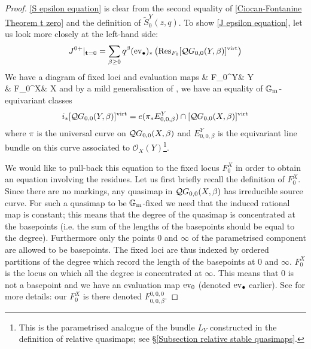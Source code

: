 \begin{proof}
\eqref{S epsilon equation} is clear from the second equality of \eqref{Ciocan-Fontanine Theorem t zero} and the definition of $\tilde{S}^Y_0(z,q)$. To show  \eqref{J epsilon equation}, let us look more closely at the left-hand side:
\begin{equation*} {J^{0+}}|_{{\mathbf{t}=0}} = \sum_{\beta\geq 0}q^\beta(\operatorname{ev}_\bullet)_* \left( \operatorname{Res}_{F_0}[\mathcal{Q}G_{0,0}(Y,\beta)]^{\operatorname{virt}} \right) \end{equation*}
We have a diagram of fixed loci and evaluation maps
\bcd
{}\ar[d,hook,"i"] & F_0^Y\ar[d, hook, "i"]\ar[l,hook']\ar[r,"\ev_{\bullet}"] & Y\ar[d,hook,"i"] \\
 & F_0^X\ar[l,hook']\ar[r,"\ev_{\bullet}"] & X
\ecd
and by a mild generalisation of \cite[Propositions 6.2.2 and 6.2.3]{CFKM}, we have an equality of $\mathbb{G}_{\text{m}}$-equivariant classes
\begin{equation*} i_*[\mathcal{Q}G_{0,0}(Y,\beta)]^{\operatorname{virt}}=e(\pi_* E^Y_{0,0,\beta})\cap [\mathcal{Q}G_{0,0}(X,\beta)]^{\operatorname{virt}} \end{equation*} 
where $\pi$ is the universal curve on $\mathcal{Q}G_{0,0}(X,\beta)$ and $E^Y_{0,0,\beta}$ is the equivariant line bundle on this curve associated to $\mathcal O_X(Y)$\footnote{This is the parametrised analogue of the bundle $L_Y$ constructed in the definition of relative quasimaps; see \S \ref{Subsection relative stable quasimaps}.}.
 
We would like to pull-back this equation to the fixed locus $F_0^X$ in order to obtain an equation involving the residues. Let us first briefly recall the definition of $F_0^X$. Since there are no markings, any quasimap in $\mathcal{Q}G_{0,0}(X,\beta)$ has irreducible source curve. For such a quasimap to be $\mathbb{G}_{\text{m}}$-fixed we need that the induced rational map is constant; this means that the degree of the quasimap is concentrated at the basepoints (i.e. the sum of the lengths of the basepoints should be equal to the degree). Furthermore only the points $0$ and $\infty$ of the parametrised component are allowed to be basepoints. The fixed loci are thus indexed by ordered partitions of the degree which record the length of the basepoints at $0$ and $\infty$. $F_0^X$ is the locus on which all the degree is concentrated at $\infty$. This means that $0$ is not a basepoint and we have an evaluation map $\operatorname{ev}_0$ (denoted $\operatorname{ev}_{\bullet}$ earlier). See \cite[\S 4]{CF-K-wallcrossing} for more details: our $F_0^X$ is there denoted $F^{0,0,0}_{0,0,\beta}$.


\end{proof}

